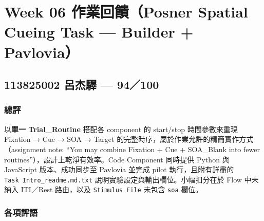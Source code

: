 \documentclass[14pt,]{extarticle}
\date{}
\begin{document}
\hypertarget{week-06-ux4f5cux696dux56deux994bposner-spatial-cueing-task-builder-pavlovia}{%
\section{Week 06 作業回饋（Posner Spatial Cueing Task --- Builder +
Pavlovia）}\label{week-06-ux4f5cux696dux56deux994bposner-spatial-cueing-task-builder-pavlovia}}

\hypertarget{ux5442ux6770ux9a5b-94100}{%
\subsection{113825002 呂杰驛 ---
94／100}\label{ux5442ux6770ux9a5b-94100}}

\hypertarget{ux7e3dux8a55}{%
\subsubsection{總評}\label{ux7e3dux8a55}}

以\textbf{單一 Trial\_Routine} 搭配各 component 的 start/stop
時間參數來重現 Fixation → Cue → SOA → Target
的完整時序，屬於作業允許的精簡實作方式（assignment note: ``You may
combine Fixation + Cue + SOA\_Blank into fewer
routines''），設計上乾淨有效率。Code Component 同時提供 Python 與
JavaScript 版本、成功同步至 Pavlovia 並完成 pilot 執行，且附有詳盡的
\texttt{Task\ Intro\_readme.md.txt} 說明實驗設定與輸出欄位。小幅扣分在於
Flow 中未納入 ITI／Rest 路由，以及 \texttt{Stimulus\ File} 未包含
\texttt{soa} 欄位。

\hypertarget{ux5404ux9805ux8a55ux8a9e}{%
\subsubsection{各項評語}\label{ux5404ux9805ux8a55ux8a9e}}
\end{document}
